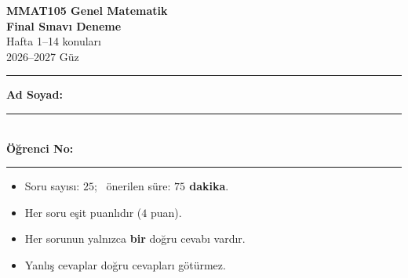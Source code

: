 \documentclass[11pt,a4paper]{article}
\begin{document}
\begin{minipage}[c]{\textwidth}
{\LARGE\bfseries\color{anamavi} MMAT105 Genel Matematik}\\[4pt]
{\large\bfseries Final Sınavı Deneme}\\[2pt]
{\normalsize Hafta 1--14 konuları}\\[6pt]
{\small 2026--2027 Güz}
\end{minipage}

\vspace{4pt}\noindent\textcolor{anamavi}{\rule{\textwidth}{1pt}}

\begin{minipage}[t]{0.55\textwidth}
\vspace{2pt}
\textbf{Ad Soyad:} \rule{0.68\linewidth}{0.4pt}\\[12pt]
\textbf{Öğrenci No:} \rule{0.6\linewidth}{0.4pt}
\end{minipage}\hfill
\begin{minipage}[t]{0.42\textwidth}
\begin{kural}[Yönerge]
\small\raggedright
\begin{itemize}[leftmargin=*,itemsep=0pt,topsep=0pt]
\item Soru sayısı: \(25\); \ önerilen süre: \textbf{\(75\) dakika}.
\item Her soru eşit puanlıdır (\(4\) puan).
\item Her sorunun yalnızca \textbf{bir} doğru cevabı vardır.
\item Yanlış cevaplar doğru cevapları götürmez.
\end{itemize}
\end{kural}
\end{minipage}
\end{document}
